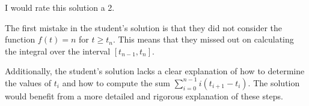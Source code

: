 I would rate this solution a 2.

The first mistake in the student's solution is that they did not consider the function $f(t) = n$ for $t \geq t_n$. This means that they missed out on calculating the integral over the interval $[t_{n-1}, t_n]$.

Additionally, the student's solution lacks a clear explanation of how to determine the values of $t_i$ and how to compute the sum $\sum_{i=0}^{n-1} i(t_{i+1} - t_i)$. The solution would benefit from a more detailed and rigorous explanation of these steps.
